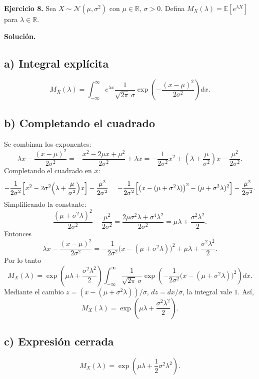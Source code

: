 \documentclass[letterpaper, 12pt]{article}
\begin{document}
    \newpage

    \textbf{Ejercicio 8.} Sea \( X \sim \mathcal{N}(\mu, \sigma^2) \) con \(\mu \in \mathbb{R}\), \(\sigma>0\). Defina \(M_X(\lambda)=\mathbb{E}[e^{\lambda X}]\) para \(\lambda\in\mathbb{R}\).

    \textbf{Solución.}

    \subsection*{a) Integral explícita}
    \[
    M_X(\lambda)=\int_{-\infty}^{\infty} e^{\lambda x} \frac{1}{\sqrt{2\pi}\,\sigma}\exp\!\left(-\frac{(x-\mu)^2}{2\sigma^2}\right)dx.
    \]

    \subsection*{b) Completando el cuadrado}
    Se combinan los exponentes:
    \[
    \lambda x - \frac{(x-\mu)^2}{2\sigma^2}
    = -\frac{x^2-2\mu x+\mu^2}{2\sigma^2}+\lambda x
    = -\frac{1}{2\sigma^2}x^2+\left(\lambda+\frac{\mu}{\sigma^2}\right)x-\frac{\mu^2}{2\sigma^2}.
    \]
    Completando el cuadrado en \(x\):
    \[
    -\frac{1}{2\sigma^2}\Bigl[x^2-2\sigma^2\Bigl(\lambda+\frac{\mu}{\sigma^2}\Bigr)x\Bigr]-\frac{\mu^2}{2\sigma^2}
    = -\frac{1}{2\sigma^2}\Bigl[\bigl(x-(\mu+\sigma^2\lambda)\bigr)^2-(\mu+\sigma^2\lambda)^2\Bigr]-\frac{\mu^2}{2\sigma^2}.
    \]
    Simplificando la constante:
    \[
    \frac{(\mu+\sigma^2\lambda)^2}{2\sigma^2}-\frac{\mu^2}{2\sigma^2}
    = \frac{2\mu\sigma^2\lambda+\sigma^4\lambda^2}{2\sigma^2}
    = \mu\lambda+\frac{\sigma^2\lambda^2}{2}.
    \]
    Entonces
    \[
    \lambda x-\frac{(x-\mu)^2}{2\sigma^2}= -\frac{1}{2\sigma^2}\bigl(x-(\mu+\sigma^2\lambda)\bigr)^2+\mu\lambda+\frac{\sigma^2\lambda^2}{2}.
    \]
    Por lo tanto
    \[
    M_X(\lambda)=\exp\!\left(\mu\lambda+\frac{\sigma^2\lambda^2}{2}\right)
    \int_{-\infty}^{\infty}\frac{1}{\sqrt{2\pi}\,\sigma}\exp\!\left(-\frac{1}{2\sigma^2}\bigl(x-(\mu+\sigma^2\lambda)\bigr)^2\right)dx.
    \]
    Mediante el cambio \(z=(x-(\mu+\sigma^2\lambda))/\sigma\), \(dz=dx/\sigma\), la integral vale \(1\). Así,
    \[
    M_X(\lambda)=\exp\!\left(\mu\lambda+\frac{\sigma^2\lambda^2}{2}\right).
    \]

    \subsection*{c) Expresión cerrada}
    \[
    \boxed{M_X(\lambda)=\exp\!\left(\mu\lambda+\frac{1}{2}\sigma^2\lambda^2\right)}.
    \]
    \newpage
\end{document}
